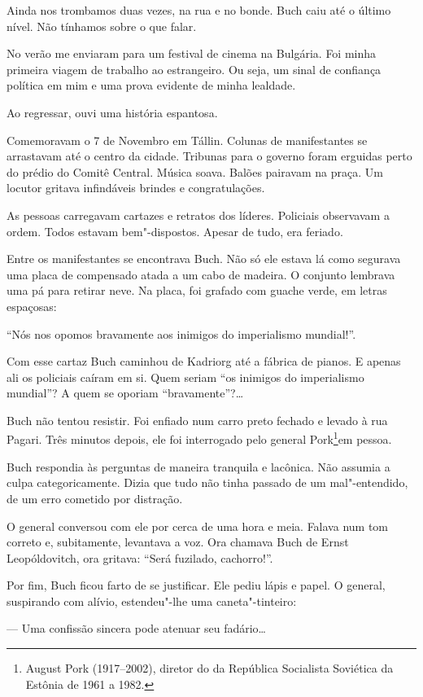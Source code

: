 Ainda nos trombamos duas vezes, na rua e no bonde. Buch caiu até o
último nível. Não tínhamos sobre o que falar.

No verão me enviaram para um festival de cinema na Bulgária. Foi minha
primeira viagem de trabalho ao estrangeiro. Ou seja, um sinal de
confiança política em mim e uma prova evidente de minha lealdade.

Ao regressar, ouvi uma história espantosa.

Comemoravam o 7 de Novembro em Tállin. Colunas de manifestantes se
arrastavam até o centro da cidade. Tribunas para o governo foram
erguidas perto do prédio do Comitê Central. Música soava. Balões
pairavam na praça. Um locutor gritava infindáveis brindes e
congratulações.

As pessoas carregavam cartazes e retratos dos líderes. Policiais
observavam a ordem. Todos estavam bem"-dispostos. Apesar de tudo, era
feriado.

Entre os manifestantes se encontrava Buch. Não só ele estava lá como
segurava uma placa de compensado atada a um cabo de madeira. O conjunto
lembrava uma pá para retirar neve. Na placa, foi grafado com guache
verde, em letras espaçosas:

``Nós nos opomos bravamente aos inimigos do imperialismo mundial!''.

Com esse cartaz Buch caminhou de Kadriorg até a fábrica de pianos. E
apenas ali os policiais caíram em si. Quem seriam ``os inimigos do
imperialismo mundial''? A quem se oporiam ``bravamente''?\ldots{}

Buch não tentou resistir. Foi enfiado num carro preto fechado e levado à
rua Pagari. Três minutos depois, ele foi interrogado pelo general
Pork\footnote{August Pork (1917--2002), diretor do  da República
  Socialista Soviética da Estônia de 1961 a 1982.}em pessoa.

Buch respondia às perguntas de maneira tranquila e lacônica. Não assumia
a culpa categoricamente. Dizia que tudo não tinha passado de um
mal"-entendido, de um erro cometido por distração.

O general conversou com ele por cerca de uma hora e meia. Falava num tom
correto e, subitamente, levantava a voz. Ora chamava Buch de Ernst
Leopóldovitch, ora gritava: ``Será fuzilado, cachorro!''.

Por fim, Buch ficou farto de se justificar. Ele pediu lápis e papel. O
general, suspirando com alívio, estendeu"-lhe uma caneta"-tinteiro:

--- Uma confissão sincera pode atenuar seu fadário\ldots{}

